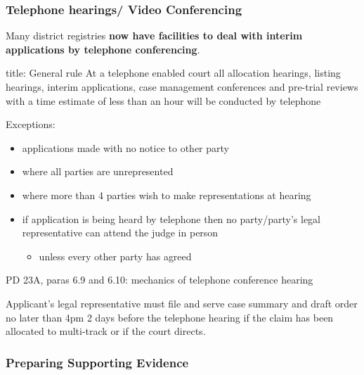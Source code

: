 \documentclass[
]{article}
\newenvironment{Shaded}{}{}
\newcommand{\NormalTok}[1]{#1}
\providecommand{\tightlist}{%
  \setlength{\itemsep}{0pt}\setlength{\parskip}{0pt}}
\begin{document}
\hypertarget{telephone-hearings-video-conferencing}{%
\subsubsection{Telephone hearings/ Video
Conferencing}\label{telephone-hearings-video-conferencing}}

Many district registries \textbf{now have facilities to deal with
interim applications by telephone conferencing}.

\begin{Shaded}
\begin{Highlighting}[]
\NormalTok{title: General rule}
\NormalTok{At a telephone enabled court all allocation hearings, listing hearings, interim applications, case management conferences and pre{-}trial reviews with a time estimate of less than an hour will be conducted by telephone}
\end{Highlighting}
\end{Shaded}

Exceptions:

\begin{itemize}
\tightlist
\item
  applications made with no notice to other party
\item
  where all parties are unrepresented
\item
  where more than 4 parties wish to make representations at hearing
\item
  if application is being heard by telephone then no party/party's legal
  representative can attend the judge in person

  \begin{itemize}
  \tightlist
  \item
    unless every other party has agreed
  \end{itemize}
\end{itemize}

PD 23A, paras 6.9 and 6.10: mechanics of telephone conference hearing

\begin{Shaded}
\begin{Highlighting}[]
\NormalTok{Applicant’s legal representative must file and serve case summary and draft order no later than 4pm 2 days before the telephone hearing if the claim has been allocated to multi{-}track or if the court directs.}
\end{Highlighting}
\end{Shaded}

\hypertarget{preparing-supporting-evidence}{%
\subsubsection{Preparing Supporting
Evidence}\label{preparing-supporting-evidence}}
\end{document}
